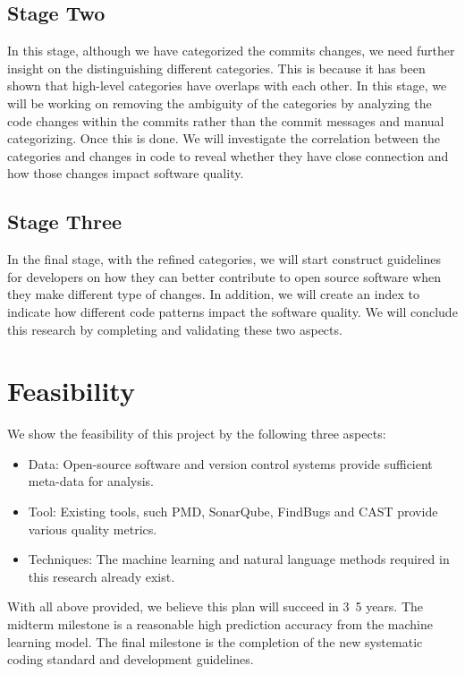 \documentclass[10pt,conference]{IEEEtran}
\begin{document}
\subsection{Stage Two}
In this stage, although we have categorized the commits changes, we need further insight on the distinguishing different categories.
This is because it has been shown that high-level categories have overlaps with each other.
In this stage, we will be working on removing the ambiguity of the categories by analyzing the code changes within the commits rather than the commit messages and manual categorizing.
Once this is done. We will investigate the correlation between the categories and changes in code to reveal whether they have close connection and how those changes impact software quality.

\subsection{Stage Three}
In the final stage, with the refined categories, we will start construct guidelines for developers on how they can better contribute to open source software when they make different type of changes.
In addition, we will create an index to indicate how different code patterns impact the software quality.
We will conclude this research by completing and validating these two aspects. 

\section{Feasibility}
We show the feasibility of this project by the following three aspects:
\begin{itemize}
    \item Data: Open-source software and version control systems provide sufficient meta-data for analysis.
    \item Tool: Existing tools, such PMD, SonarQube, FindBugs and CAST provide various quality metrics.
    \item Techniques: The machine learning and natural language methods required in this research already exist.
\end{itemize}
With all above provided, we believe this plan will succeed in 3~5 years.
The midterm milestone is a reasonable high prediction accuracy from the machine learning model.
The final milestone is the completion of the new systematic coding standard and development guidelines.
\end{document}
